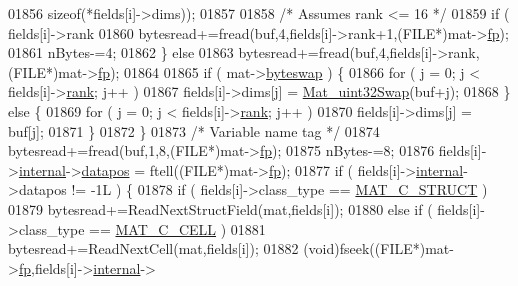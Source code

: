 \begin{DoxyCode}
{{{{{{{{{{{{{{{{01856                                          \textcolor{keyword}{sizeof}(*fields[i]->dims));
01857 
01858                 \textcolor{comment}{/* Assumes rank <= 16 */}
01859                 \textcolor{keywordflow}{if} ( fields[i]->rank %
01860                     bytesread+=fread(buf,4,fields[i]->rank+1,(FILE*)mat->\hyperlink{struct__mat__t_a85f562e407ca9ad4d2a6e14f839432b7}{fp});
01861                     nBytes-=4;
01862                 \} \textcolor{keywordflow}{else}
01863                     bytesread+=fread(buf,4,fields[i]->rank,(FILE*)mat->\hyperlink{struct__mat__t_a85f562e407ca9ad4d2a6e14f839432b7}{fp});
01864 
01865                 \textcolor{keywordflow}{if} ( mat->\hyperlink{struct__mat__t_a99d207977af5e04941ace56d71817a40}{byteswap} ) \{
01866                     \textcolor{keywordflow}{for} ( j = 0; j < fields[i]->\hyperlink{group___m_a_t_a84ba70c96ded13cc555fa75b768d9921}{rank}; j++ )
01867                         fields[i]->dims[j] = \hyperlink{endian_8c_a8cb0d0750e2eaf9840d95db531934f4f}{Mat\_uint32Swap}(buf+j);
01868                 \} \textcolor{keywordflow}{else} \{
01869                     \textcolor{keywordflow}{for} ( j = 0; j < fields[i]->\hyperlink{group___m_a_t_a84ba70c96ded13cc555fa75b768d9921}{rank}; j++ )
01870                         fields[i]->dims[j] = buf[j];
01871                 \}
01872             \}
01873             \textcolor{comment}{/* Variable name tag */}
01874             bytesread+=fread(buf,1,8,(FILE*)mat->\hyperlink{struct__mat__t_a85f562e407ca9ad4d2a6e14f839432b7}{fp});
01875             nBytes-=8;
01876             fields[i]->\hyperlink{group___m_a_t_a6e97e3ed9f40c49322c18561c2a94e92}{internal}->\hyperlink{structmatvar__internal_afd3bfaab126a160bd6855563e1ea0a7e}{datapos} = ftell((FILE*)mat->\hyperlink{struct__mat__t_a85f562e407ca9ad4d2a6e14f839432b7}{fp});
01877             \textcolor{keywordflow}{if} ( fields[i]->\hyperlink{namespaceinternal}{internal}->datapos != -1L ) \{
01878                 \textcolor{keywordflow}{if} ( fields[i]->class\_type == \hyperlink{group___m_a_t_ggad4d60ae7b709fc81bfd744fb4c857c40acb467c7749c80902b798134c729bb521}{MAT\_C\_STRUCT} )
01879                     bytesread+=ReadNextStructField(mat,fields[i]);
01880                 \textcolor{keywordflow}{else} \textcolor{keywordflow}{if} ( fields[i]->class\_type == \hyperlink{group___m_a_t_ggad4d60ae7b709fc81bfd744fb4c857c40a2f7abb47a1c51e248bd4e5e03cc81b08}{MAT\_C\_CELL} )
01881                     bytesread+=ReadNextCell(mat,fields[i]);
01882                 (void)fseek((FILE*)mat->\hyperlink{struct__mat__t_a85f562e407ca9ad4d2a6e14f839432b7}{fp},fields[i]->\hyperlink{group___m_a_t_a6e97e3ed9f40c49322c18561c2a94e92}{internal}->
}}}}}}}}}}}}}}}}
\end{DoxyCode}
